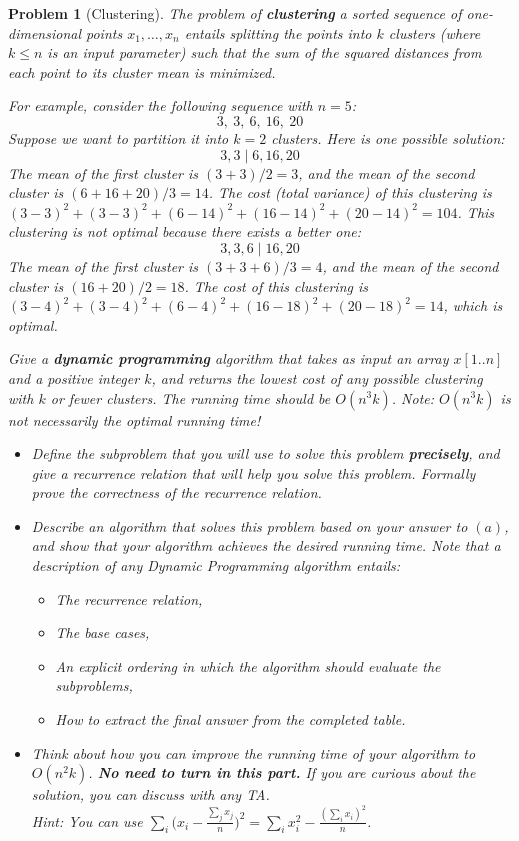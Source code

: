 \documentclass[10pt]{article}
\newtheorem{problem}{\sc\color{cit}Problem}
\begin{document}
\begin{problem}[Clustering]
The problem of \textbf{clustering} a sorted sequence of one-dimensional points $x_1, \dots, x_n$ entails splitting the points into $k$ clusters (where $k \leq n$ is an input parameter) such that the sum of the squared distances from each point to its cluster mean is minimized.

For example, consider the following sequence with $n = 5$:
$$3,\ 3,\ 6,\ 16,\ 20$$
Suppose we want to partition it into $k=2$ clusters. Here is one possible solution:
$$3, 3 \mid 6, 16, 20$$
The mean of the first cluster is $(3+3)/2 = 3$, and the mean of the second cluster is $(6+16+20)/3 = 14$. The cost (total variance) of this clustering is $(3-3)^2 + (3-3)^2 + (6-14)^2 + (16-14)^2 + (20-14)^2 = 104$. This clustering is not optimal because there exists a better one:
$$3, 3, 6 \mid 16, 20$$
The mean of the first cluster is $(3+3+6)/3 = 4$, and the mean of the second cluster is $(16+20)/2 = 18$. The cost of this clustering is $(3-4)^2 + (3-4)^2 + (6-4)^2 + (16-18)^2 + (20-18)^2 = 14$, which is optimal.

Give a \textbf{dynamic programming} algorithm that takes as input an array $x[1..n]$ and a positive integer $k$, and returns the lowest cost of any possible clustering with $k$ or fewer clusters. The running time should be $O(n^3k)$. Note: $O(n^3k)$ is not necessarily the optimal running time!

\begin{itemize}
    \item[(a)] Define the subproblem that you will use to solve this problem \textbf{precisely}, and give a recurrence relation that will help you solve this problem. Formally prove the correctness of the recurrence relation.
    \item[(b)] Describe an algorithm that solves this problem based on your answer to $(a)$, and show that your algorithm achieves the desired running time. Note that a description of any Dynamic Programming algorithm entails:
    \begin{itemize}
        \item The recurrence relation,
        \item The base cases,
        \item An explicit ordering in which the algorithm should evaluate the subproblems,
        \item How to extract the final answer from the completed table.
    \end{itemize}
    \item[(c)] Think about how you can improve the running time of your algorithm to $O(n^2 k)$. \textbf{No need to turn in this part.} If you are curious about the solution, you can discuss with any TA. \\
\textit{Hint:} You can use $\sum_{i} \big(x_i - \frac{\sum_j x_j}{n}\big)^2 = \sum_i x_i^2 - \frac{(\sum_i x_i)^2}{n}$.
\end{itemize}
\end{problem}
\end{document}

